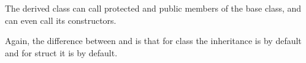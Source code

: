 The derived class can call protected and public members of the base class, and can even call its constructors.

\begin{rem}
  Again, the difference between  and  is that for class the inheritance is  by default and for struct
  it is  by default.
\end{rem}